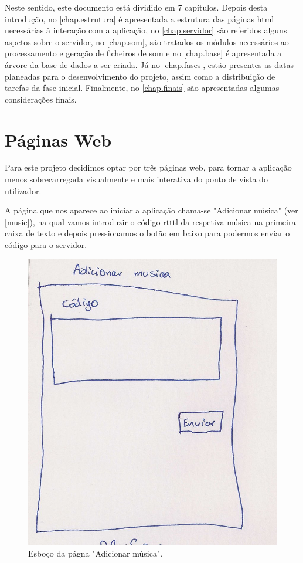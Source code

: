 \documentclass{report}
\begin{document}
Neste sentido, este documento está dividido em 7 capítulos. Depois desta introdução, no \autoref{chap.estrutura} é apresentada a estrutura das páginas \ac{html} necessárias à interação com a aplicação, no \autoref{chap.servidor} são referidos alguns aspetos sobre o servidor, no \autoref{chap.som}, são tratados os módulos necessários ao processamento e geração de ficheiros de som e no \autoref{chap.base} é apresentada a árvore da base de dados a ser criada. Já no \autoref{chap.fases}, estão presentes as datas planeadas para o desenvolvimento do projeto, assim como a distribuição de tarefas da fase inicial. Finalmente, no \autoref{chap.finais} são apresentadas algumas considerações finais.

\chapter{Páginas Web}
\label{chap.estrutura}

Para este projeto decidimos optar por três páginas web, para tornar a aplicação menos sobrecarregada visualmente e mais interativa do ponto de vista do utilizador.

A página que nos aparece ao iniciar a aplicação chama-se "Adicionar música" (ver \autoref{music}), na qual vamos introduzir o código \ac{rtttl} da respetiva música na primeira caixa de texto e depois pressionamos o botão em baixo para podermos enviar o código para o servidor.

\begin{figure}[htp]
\centering
\includegraphics[width=\textwidth]{images/adicionarmusica.jpg}
\caption{Esboço da págna "Adicionar música".}
\label{music}
\end{figure}
\end{document}
